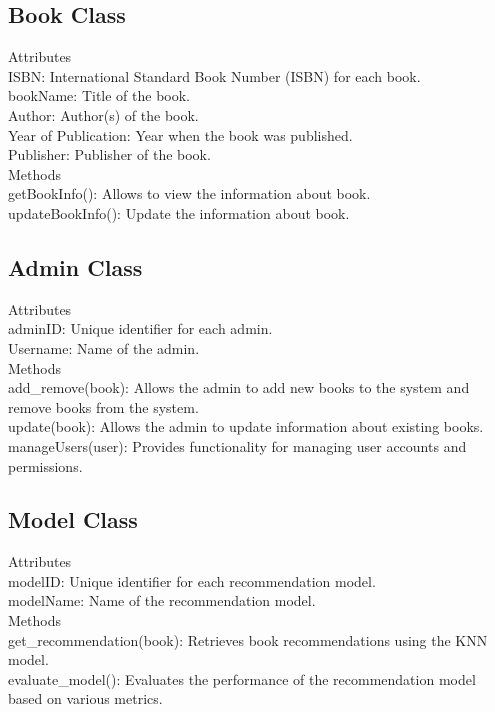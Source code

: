 \subsection*{Book Class}
Attributes\\
ISBN: International Standard Book Number (ISBN) for each book.\\
bookName: Title of the book.\\
Author: Author(s) of the book.\\
Year of Publication: Year when the book was published.\\
Publisher: Publisher of the book.\\
Methods\\
getBookInfo(): Allows to view the information about book.\\
updateBookInfo(): Update the information about book.\\

\subsection*{Admin Class}
Attributes\\
adminID: Unique identifier for each admin.\\
Username: Name of the admin.\\
Methods\\
add\_remove(book): Allows the admin to add new books to the system and remove books from the system.\\
update(book): Allows the admin to update information about existing books.\\
manageUsers(user): Provides functionality for managing user accounts and permissions.\\

\subsection*{Model Class}
Attributes\\
modelID: Unique identifier for each recommendation model.\\
modelName: Name of the recommendation model.\\
Methods\\
get\_recommendation(book): Retrieves book recommendations using the KNN model.\\
evaluate\_model(): Evaluates the performance of the recommendation model based on various metrics.\\



